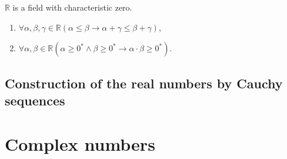 \begin{theorem}
    $\mathbb{R}$ is a field with characteristic zero.
\end{theorem}

\begin{theorem}
    \begin{enumerate}[label = (\roman*)]
        \item $\forall\alpha,\beta,\gamma\in\mathbb{R}( \alpha\le\beta \rightarrow \alpha + \gamma \le \beta + \gamma )$,
        \item $\forall\alpha,\beta\in\mathbb{R} (\alpha\ge{0}^{*}\land\beta\ge{0}^{*} \rightarrow\alpha\cdot\beta\ge{0}^{*})$.
    \end{enumerate}
\end{theorem}

\subsection*{Construction of the real numbers by Cauchy sequences}

\section{Complex numbers}

